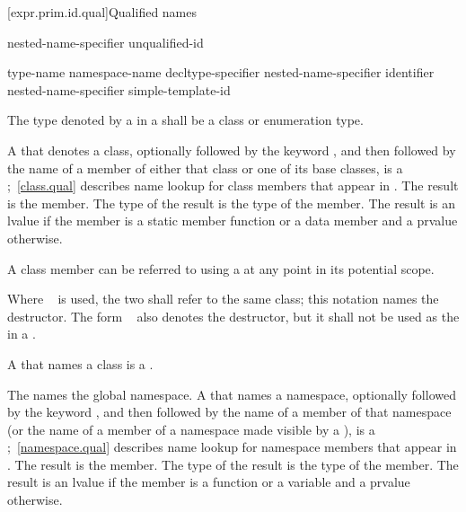[expr.prim.id.qual]{Qualified names}

%
%
%
\begin{bnf}
\br
    nested-name-specifier  unqualified-id
\end{bnf}

%
%
%
\begin{bnf}
\br
    \terminal{::}\br
    type-name \terminal{::}\br
    namespace-name \terminal{::}\br
    decltype-specifier \terminal{::}\br
    nested-name-specifier identifier \terminal{::}\br
    nested-name-specifier  simple-template-id \terminal{::}
\end{bnf}

\pnum
The type denoted by a  in a
 shall be a class or enumeration
type.

\pnum
A  that denotes a class, optionally
followed by the keyword , and then
followed by the name of a member of either that class
or one of its base classes, is a
%
;~\ref{class.qual} describes name lookup for
class members that appear in . The result is the
member. The type of the result is the type of the member. The result is
an lvalue if the member is a static member function or a data member and a
prvalue otherwise.
\begin{note}
A class member can be referred to using a  at any
point in its potential scope.
\end{note}
Where
 \tcode{::\~}~ is used,
the two  shall refer to the same class; this
notation names the destructor.
The form \tcode{\~}~ also denotes the destructor,
but it shall not be used as the  in a .
\begin{note}
A  that names a class is a
.
\end{note}

\pnum
The  \tcode{::} names the global namespace.
A  that names a
namespace, optionally followed by the keyword
, and then followed by the name of a member
of that namespace (or the name of a member of a namespace made visible by a
), is a
%
;~\ref{namespace.qual} describes name lookup for
namespace members that appear in . The result is
the member. The type of the result is the type of the member. The result
is an lvalue if the member is a function or a variable and a prvalue otherwise.

